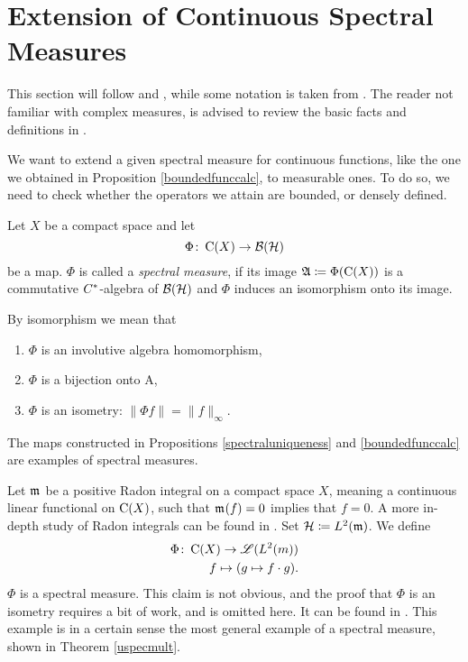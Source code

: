
\section{Extension of Continuous Spectral Measures}\label{section4}

This section will follow \cite{LesHaupt} and \cite[pp. 341- 345]{RudinFuncAna}
, while some notation
is taken from \cite[Ch. 6]{PedAnaN}. The reader not familiar
with complex measures, is advised to review the basic facts
and definitions in 
\cite[Ch. 6]{RudinRealComp}.

We want to extend a given spectral measure for continuous functions,
like the one we obtained in Proposition \ref{boundedfunccalc}, to measurable ones. 
To do so, we need to check whether the operators we attain
are bounded, or densely defined.
\begin{defi}
 
 Let $X$ be a compact space and let
 \[
  \Phi \colon \operatorname{C} (X) \to \mathcal{B}(\mathcal{H})
 \]
be a map. $\Phi$ is called a \textit{spectral measure}, if its image 
$\mathfrak{A} \coloneqq \Phi(\operatorname{C} (X))$ is a commutative $C^{*}$-algebra of $\mathcal{B}(\mathcal{H})$ and 
$\Phi$ induces an isomorphism onto its image.
\end{defi}

\begin{rem}
 By isomorphism we mean that
 \begin{enumerate}
  \item $\Phi$ is an involutive algebra homomorphism,
  \item $\Phi$ is a bijection onto A,
  \item $\Phi$ is an isometry: $\| \Phi f \| = \| f \|_\infty$.
 \end{enumerate}

\end{rem}

\begin{expl}
 The maps constructed in Propositions \ref{spectraluniqueness}
 and \ref{boundedfunccalc} are examples
 of spectral measures.
  
Let $\mathfrak{m}_{}$ be a positive Radon integral on a compact space $X$, meaning a
continuous linear functional on $\operatorname{C} (X)$, such that $\mathfrak{m}_{}(f) = 0$ implies 
that $f=0$. A more in-depth study of Radon integrals can be found in 
\cite[Chapter~6.1]{PedAnaN}. Set $\mathcal{H} \coloneqq L^2(\mathfrak{m})$.
We define 
\begin{align*}
 \Phi \colon \operatorname{C}(X) \to \mathscr{L}({L^2({m})}) \\
 f \mapsto (g \mapsto f\cdot g).
\end{align*}
$\Phi$ is a spectral measure. This claim is not obvious, and the proof
that $\Phi$ is an isometry requires a bit of work, and is omitted here.
It can be found in \cite{LesHaupt}. This example is in a certain sense
the most general example of a spectral measure, shown in Theorem \ref{uspecmult}.
\end{expl}

